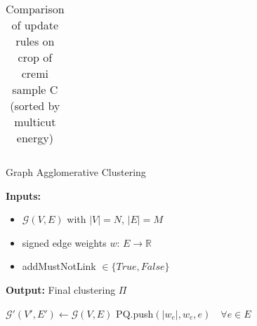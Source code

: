 \begin{table*}
\begin{subtable}[t!]{0.98\textwidth}
\begin{tabular}{c| c | c| c | c | c | c | c}
        \end{tabular}
    \end{subtable} 
    \caption{Comparison of update rules on crop of cremi sample C (sorted by multicut energy)  }
    \label{tab:linkage-criteria}
\end{table*}


\begin{algorithm}
  \caption{Graph Agglomerative Clustering}
\setlength{\parindent}{\algorithmicindent} \textbf{Inputs:}
     \begin{itemize}[leftmargin=1.3cm,topsep=0.1pt,itemsep=-1.ex]
   \item $\mathcal{G}(V,E)$ with $|V|=N$, $|E|=M$
   \item signed edge weights $w:\,E\rightarrow\mathbb{R}$
   \item {\color{blue}addMustNotLink} $\in \{ True, False\}$
   \end{itemize}
   \vspace{0.4em}
   
\setlength{\parindent}{\algorithmicindent} \textbf{Output:} Final clustering $\Pi$


  \hspace*{\algorithmicindent} 
  \begin{algorithmic}[1]


      \State $\mathcal{G}'(V', E') \gets \mathcal{G}(V, E)$  
        \State PQ.push$(|w_e|, w_e, e) \quad \forall e \in E $  
      

\end{algorithmic}
\end{algorithm}
